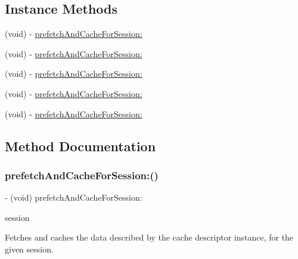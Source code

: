 \subsection*{Instance Methods}
\begin{DoxyCompactItemize}
\item 
(void) -\/ \hyperlink{interfaceFBCacheDescriptor_a1d3bbb38753d402a6f08e9402904a8d6}{prefetch\+And\+Cache\+For\+Session\+:}
\item 
(void) -\/ \hyperlink{interfaceFBCacheDescriptor_a1d3bbb38753d402a6f08e9402904a8d6}{prefetch\+And\+Cache\+For\+Session\+:}
\item 
(void) -\/ \hyperlink{interfaceFBCacheDescriptor_a1d3bbb38753d402a6f08e9402904a8d6}{prefetch\+And\+Cache\+For\+Session\+:}
\item 
(void) -\/ \hyperlink{interfaceFBCacheDescriptor_a1d3bbb38753d402a6f08e9402904a8d6}{prefetch\+And\+Cache\+For\+Session\+:}
\item 
(void) -\/ \hyperlink{interfaceFBCacheDescriptor_a1d3bbb38753d402a6f08e9402904a8d6}{prefetch\+And\+Cache\+For\+Session\+:}
\end{DoxyCompactItemize}


\subsection{Method Documentation}
\mbox{\label{interfaceFBCacheDescriptor_a1d3bbb38753d402a6f08e9402904a8d6}} 
\subsubsection{\texorpdfstring{prefetch\+And\+Cache\+For\+Session\+:()}{prefetchAndCacheForSession:()}\hspace{0.1cm}{\footnotesize\ttfamily [1/5]}}
{\footnotesize\ttfamily -\/ (void) prefetch\+And\+Cache\+For\+Session\+: \begin{DoxyParamCaption}\item[{(\hyperlink{interfaceFBSession}{F\+B\+Session} $\ast$)}]{session }\end{DoxyParamCaption}}

Fetches and caches the data described by the cache descriptor instance, for the given session.


